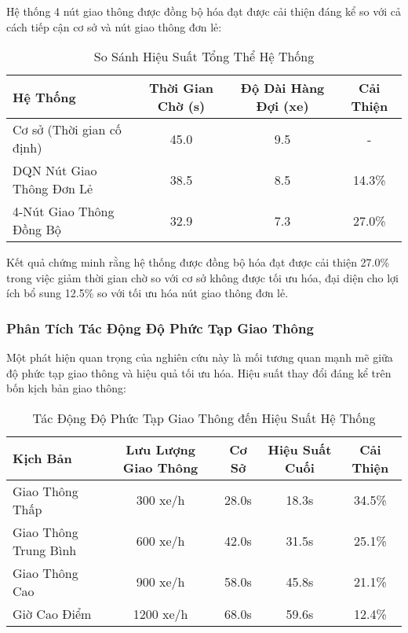 Hệ thống 4 nút giao thông được đồng bộ hóa đạt được cải thiện đáng kể so với cả cách tiếp cận cơ sở 
và nút giao thông đơn lẻ:

\begin{table}[h]
\centering
\caption{So Sánh Hiệu Suất Tổng Thể Hệ Thống}
\label{tab:overall_performance}
\begin{tabular}{@{}lccc@{}}
\toprule
\textbf{Hệ Thống} & \textbf{Thời Gian Chờ (s)} & \textbf{Độ Dài Hàng Đợi (xe)} & \textbf{Cải Thiện} \\
\midrule
Cơ sở (Thời gian cố định) & 45.0 & 9.5 & - \\
DQN Nút Giao Thông Đơn Lẻ & 38.5 & 8.5 & 14.3\% \\
4-Nút Giao Thông Đồng Bộ & 32.9 & 7.3 & 27.0\% \\
\bottomrule
\end{tabular}
\end{table}

Kết quả chứng minh rằng hệ thống được đồng bộ hóa đạt được cải thiện 27.0\% trong việc giảm thời gian chờ 
so với cơ sở không được tối ưu hóa, đại diện cho lợi ích bổ sung 12.5\% so với tối ưu hóa nút giao thông đơn lẻ.

\subsubsection{Phân Tích Tác Động Độ Phức Tạp Giao Thông}

Một phát hiện quan trọng của nghiên cứu này là mối tương quan mạnh mẽ giữa độ phức tạp giao thông 
và hiệu quả tối ưu hóa. Hiệu suất thay đổi đáng kể trên bốn kịch bản giao thông:

\begin{table}[h]
\centering
\caption{Tác Động Độ Phức Tạp Giao Thông đến Hiệu Suất Hệ Thống}
\label{tab:complexity_analysis}
\begin{tabular}{@{}lcccc@{}}
\toprule
\textbf{Kịch Bản} & \textbf{Lưu Lượng Giao Thông} & \textbf{Cơ Sở} & \textbf{Hiệu Suất Cuối} & \textbf{Cải Thiện} \\
\midrule
Giao Thông Thấp & 300 xe/h & 28.0s & 18.3s & 34.5\% \\
Giao Thông Trung Bình & 600 xe/h & 42.0s & 31.5s & 25.1\% \\
Giao Thông Cao & 900 xe/h & 58.0s & 45.8s & 21.1\% \\
Giờ Cao Điểm & 1200 xe/h & 68.0s & 59.6s & 12.4\% \\
\bottomrule
\end{tabular}
\end{table}

